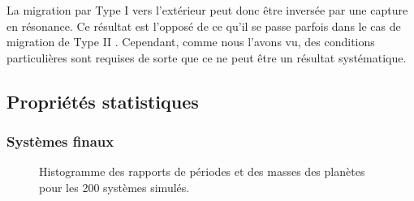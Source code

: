 La migration par Type I vers l'extérieur peut donc être inversée par une capture en résonance. Ce résultat est l'opposé de ce
qu'il se passe parfois dans le cas de migration de Type II \citep[Grand Tack model]{masset2001reversing, morbidelli2007dynamics,
pierens2011twophase}. Cependant, comme nous l'avons vu, des conditions particulières sont requises de sorte que ce ne peut être
un résultat systématique.

\subsection{Propriétés statistiques}
\subsubsection{Systèmes finaux}
\begin{figure}[htbp]
\centering
{}\hfill
{}

\caption{Histogramme des rapports de périodes et des masses des planètes pour les 200 systèmes simulés.}
\end{figure}

